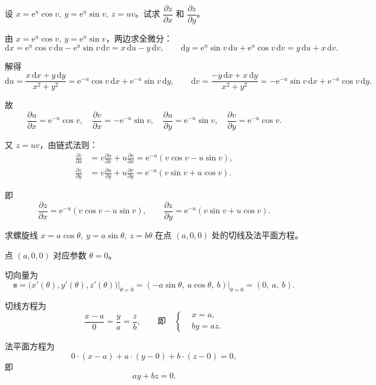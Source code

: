 \documentclass[answer]{THUExam}
\begin{document}
\begin{problem}
设 $x=\mathrm{e}^u\cos v,\ y=\mathrm{e}^u\sin v,\ z=uv$。试求 $\dfrac{\partial z}{\partial x}$ 和 $\dfrac{\partial z}{\partial y}$。
\end{problem}
\begin{solution}
由 $x=\mathrm{e}^u\cos v,\ y=\mathrm{e}^u\sin v$，两边求全微分：
\[
\mathrm{d}x=\mathrm{e}^u\cos v\,\mathrm{d}u-\mathrm{e}^u\sin v\,\mathrm{d}v=x\,\mathrm{d}u-y\,\mathrm{d}v,\qquad
\mathrm{d}y=\mathrm{e}^u\sin v\,\mathrm{d}u+\mathrm{e}^u\cos v\,\mathrm{d}v=y\,\mathrm{d}u+x\,\mathrm{d}v.
\]

解得
\[
\mathrm{d}u=\frac{x\,\mathrm{d}x+y\,\mathrm{d}y}{x^2+y^2}=\mathrm{e}^{-u}\cos v\,\mathrm{d}x+\mathrm{e}^{-u}\sin v\,\mathrm{d}y,\qquad
\mathrm{d}v=\frac{-y\,\mathrm{d}x+x\,\mathrm{d}y}{x^2+y^2}=-\mathrm{e}^{-u}\sin v\,\mathrm{d}x+\mathrm{e}^{-u}\cos v\,\mathrm{d}y.
\]

故
\[
\frac{\partial u}{\partial x}=\mathrm{e}^{-u}\cos v,\quad
\frac{\partial v}{\partial x}=-\mathrm{e}^{-u}\sin v,\quad
\frac{\partial u}{\partial y}=\mathrm{e}^{-u}\sin v,\quad
\frac{\partial v}{\partial y}=\mathrm{e}^{-u}\cos v.
\]

又 $z=uv$，由链式法则：
\begin{align*}
\frac{\partial z}{\partial x}&=v\frac{\partial u}{\partial x}+u\frac{\partial v}{\partial x}=\mathrm{e}^{-u}(v\cos v-u\sin v),\\[4pt]
\frac{\partial z}{\partial y}&=v\frac{\partial u}{\partial y}+u\frac{\partial v}{\partial y}=\mathrm{e}^{-u}(v\sin v+u\cos v).
\end{align*}

即
\[
\boxed{\frac{\partial z}{\partial x}=\mathrm{e}^{-u}(v\cos v-u\sin v),\qquad
\frac{\partial z}{\partial y}=\mathrm{e}^{-u}(v\sin v+u\cos v)}.
\]
\end{solution}
\vspace{0.5cm}

\begin{problem}
求螺旋线 $x=a\cos\theta,\ y=a\sin\theta,\ z=b\theta$ 在点 $(a,0,0)$ 处的切线及法平面方程。
\end{problem}
\begin{solution}
点 $(a,0,0)$ 对应参数 $\theta=0$。

切向量为
\[
\boldsymbol{s}=\bigl(x'(\theta),y'(\theta),z'(\theta)\bigr)\big|_{\theta=0}=(-a\sin\theta,\ a\cos\theta,\ b)\big|_{\theta=0}=(0,\ a,\ b).
\]

切线方程为
\[
\boxed{\frac{x-a}{0}=\frac{y}{a}=\frac{z}{b}},\qquad\text{即}\quad\left\{\begin{aligned}&x=a,\\ &by=az.\end{aligned}\right.
\]

法平面方程为
\[
0\cdot(x-a)+a\cdot(y-0)+b\cdot(z-0)=0,
\]
即
\[
\boxed{ay+bz=0}.
\]
\end{solution}
\vspace{0.5cm}
\end{document}
